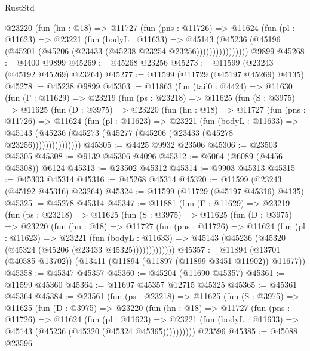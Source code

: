 \begin{lexlean}{RustStd}
\begin{coremodule}
              @23220
                (fun (hn : @18) =>
                @11727
                  (fun (pns : @11726) =>
                  @11624
                    (fun (pl : @11623) =>
                    @23221
                      (fun (bodyL : @11633) =>
                      @45143
                        (@45236
                          (@45196 (@45201 (@45206 (@23433 (@45238 @23254 @23256))))))))))))))))
    @9899
@45268 := @4400 @9899
@45269 := @45268 @23256
@45273 := @11599 (@23243 (@45192 @45269) @23264)
@45277 := @11599 (@11729 (@45197 @45269) @4135)
@45278 := @45238 @9899
@45303 := @11863
    (fun (tail0 : @4424) =>
    @11630
      (fun (Γ : @11629) =>
      @23219
        (fun (ps : @23218) =>
        @11625
          (fun (S : @3975) =>
          @11625
            (fun (D : @3975) =>
            @23220
              (fun (hn : @18) =>
              @11727
                (fun (pns : @11726) =>
                @11624
                  (fun (pl : @11623) =>
                  @23221
                    (fun (bodyL : @11633) =>
                    @45143 (@45236 (@45273 (@45277 (@45206 (@23433 (@45278 @23256)))))))))))))))
@45305 := @4425 @9932 @23506
@45306 := @23503 @45305
@45308 := @9139 @45306 @4096
@45312 := @6064 (@6089 (@4456 @45308)) @6124
@45313 := @23502 @45312
@45314 := @9903 @45313
@45315 := @45303 @45314
@45316 := @45268 @45314
@45320 := @11599 (@23243 (@45192 @45316) @23264)
@45324 := @11599 (@11729 (@45197 @45316) @4135)
@45325 := @45278 @45314
@45347 := @11881
    (fun (Γ : @11629) =>
    @23219
      (fun (ps : @23218) =>
      @11625
        (fun (S : @3975) =>
        @11625
          (fun (D : @3975) =>
          @23220
            (fun (hn : @18) =>
            @11727
              (fun (pns : @11726) =>
              @11624
                (fun (pl : @11623) =>
                @23221
                  (fun (bodyL : @11633) =>
                  @45143 (@45236 (@45320 (@45324 (@45206 (@23433 @45325)))))))))))))
@45357 := @11894 (@13701 (@40585 @13702)) (@13411 (@11894 (@11897 (@11899 @3451 @11902)) @11677))
@45358 := @45347 @45357
@45360 := @45204 (@11690 @45357)
@45361 := @11599 @45360
@45364 := @11697 @45357 @12715 @45325
@45365 := @45361 @45364
@45384 := @23561
    (fun (ps : @23218) =>
    @11625
      (fun (S : @3975) =>
      @11625
        (fun (D : @3975) =>
        @23220
          (fun (hn : @18) =>
          @11727
            (fun (pns : @11726) =>
            @11624
              (fun (pl : @11623) =>
              @23221 (fun (bodyL : @11633) => @45143 (@45236 (@45320 (@45324 @45365))))))))))
    @23596
@45385 := @45088 @23596

\end{coremodule}
\end{lexlean}
